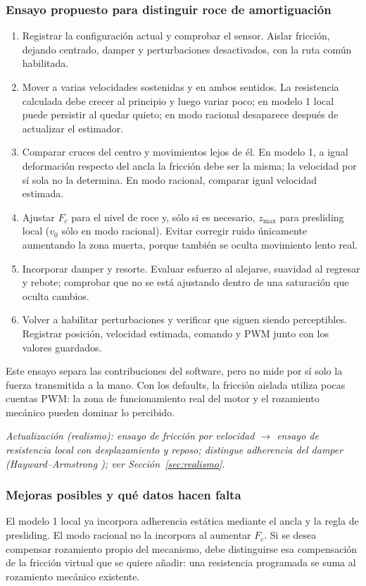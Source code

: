 \subsubsection{Ensayo propuesto para distinguir roce de amortiguación}
\begin{enumerate}
\item Registrar la configuración actual y comprobar el sensor. Aislar fricción, dejando centrado, damper y perturbaciones desactivados, con la ruta común habilitada.
\item Mover a varias velocidades sostenidas y en ambos sentidos. La resistencia calculada debe crecer al principio y luego variar poco; en modelo 1 local puede persistir al quedar quieto; en modo racional desaparece después de actualizar el estimador.
\item Comparar cruces del centro y movimientos lejos de él. En modelo 1, a igual deformación respecto del ancla la fricción debe ser la misma; la velocidad por sí sola no la determina. En modo racional, comparar igual velocidad estimada.
\item Ajustar $F_c$ para el nivel de roce y, sólo si es necesario, $z_{\max}$ para presliding local ($v_0$ sólo en modo racional). Evitar corregir ruido únicamente aumentando la zona muerta, porque también se oculta movimiento lento real.
\item Incorporar damper y resorte. Evaluar esfuerzo al alejarse, suavidad al regresar y rebote; comprobar que no se está ajustando dentro de una saturación que oculta cambios.
\item Volver a habilitar perturbaciones y verificar que siguen siendo perceptibles. Registrar posición, velocidad estimada, comando y PWM junto con los valores guardados.
\end{enumerate}
Este ensayo separa las contribuciones del software, pero no mide por sí solo la fuerza transmitida a la mano. Con los defaults, la fricción aislada utiliza pocas cuentas PWM: la zona de funcionamiento real del motor y el rozamiento mecánico pueden dominar lo percibido.

\textit{Actualización (realismo): ensayo de fricción por velocidad $\rightarrow$ ensayo de resistencia local con desplazamiento y reposo; distingue adherencia del damper (Hayward--Armstrong \cite{hayward2000}); ver Sección~\ref{sec:realismo}.}

\subsubsection{Mejoras posibles y qué datos hacen falta}
El modelo 1 local ya incorpora adherencia estática mediante el ancla y la regla de presliding. El modo racional no la incorpora al aumentar $F_c$. Si se desea compensar rozamiento propio del mecanismo, debe distinguirse esa compensación de la fricción virtual que se quiere añadir: una resistencia programada se suma al rozamiento mecánico existente.

